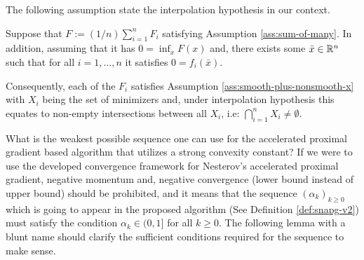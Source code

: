 \documentclass[12pt]{article}
\begin{document}
    The following assumption state the interpolation hypothesis in our context. 
    \begin{assumption}\label{ass:interp-hypothesis}
        Suppose that $F := (1/n)\sum_{i = 1}^{n} F_i$ satisfying Assumption \ref{ass:sum-of-many}. 
        In addition, assuming that it has $0 = \inf_{x}F(x)$ and, there exists some $\bar x \in \mathbb R^n$ such that for all $i = 1, \ldots, n$ it satisfies $0 = f_i(\bar x)$. 
        \par
        Consequently, each of the $F_i$ satisfies Assumption \ref{ass:smooth-plus-nonsmooth-x} with $X_i$ being the set of minimizers and, under interpolation hypothesis this equates to non-empty intersections between all $X_i$, i.e: $\bigcap_{i = 1}^n X_i \neq \emptyset$. 
    \end{assumption}
    What is the weakest possible sequence one can use for the accelerated proximal gradient based algorithm that utilizes a strong convexity constant? 
    If we were to use the developed convergence framework for Nesterov's accelerated proximal gradient, negative momentum and, negative convergence (lower bound instead of upper bound) should be prohibited, and it means that the sequence $(\alpha_k)_{k \ge 0}$ which is going to appear in the proposed algorithm (See Definition \ref{def:snapg-v2}) must satisfy the condition $\alpha_k \in (0, 1]$ for all $k \ge 0$. 
    The following lemma with a blunt name should clarify the sufficient conditions required for the sequence to make sense. 
\end{document}
